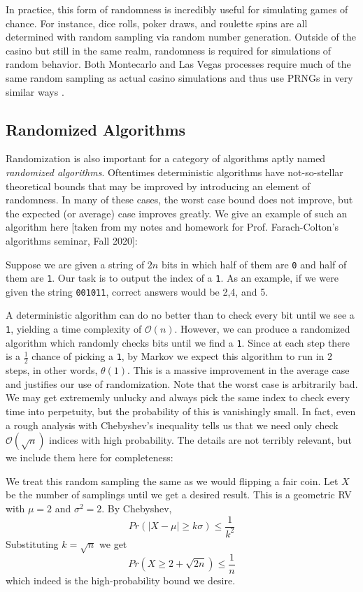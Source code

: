 \documentclass[titlepage]{article}
\theoremstyle{definition}
\newenvironment{myindentpar}[1]
  {\begin{list}{}
          {\setlength{\leftmargin}{#1}
          \setlength{\rightmargin}{#1}}
          \item[]
  }
  {\end{list}}
\begin{document}
In practice, this form of randomness is incredibly useful for simulating games of chance. For instance, dice rolls, poker draws, and roulette spins are all determined with random sampling via random number generation. Outside of the casino but still in the same realm, randomness is required for simulations of random behavior. Both Montecarlo and Las Vegas processes require much of the same random sampling as actual casino simulations and thus use PRNGs in very similar ways \cite{MTWiki}.

\subsection{Randomized Algorithms}
Randomization is also important for a category of algorithms aptly named \textit{randomized algorithms}. Oftentimes deterministic algorithms have not-so-stellar theoretical bounds that may be improved by introducing an element of randomness. In many of these cases, the worst case bound does not improve, but the expected (or average) case improves greatly. We give an example of such an algorithm here [taken from my notes and homework for Prof. Farach-Colton's algorithms seminar, Fall 2020]:
\begin{myindentpar}{1em}
Suppose we are given a string of $2n$ bits in which half of them are \verb|0| and half of them are \verb|1|. Our task is to output the index of a \verb|1|. As an example, if we were given the string \verb|001011|, correct answers would be 2,4, and 5.
\end{myindentpar}
A deterministic algorithm can do no better than to check every bit until we see a \verb|1|, yielding a time complexity of $\mathcal{O}(n)$. However, we can produce a randomized algorithm which randomly checks bits until we find a \verb|1|. Since at each step there is a $\frac{1}{2}$ chance of picking a \verb|1|, by Markov we expect this algorithm to run in $2$ steps, in other words, $\theta(1)$. This is a massive improvement in the average case and justifies our use of randomization. Note that the worst case is arbitrarily bad. We may get extrememly unlucky and always pick the same index to check every time into perpetuity, but the probability of this is vanishingly small. In fact, even a rough analysis with Chebyshev's inequality tells us that we need only check $\mathcal{O}(\sqrt{n})$ indices with high probability. The details are not terribly relevant, but we include them here for completeness:
\begin{myindentpar}{1em}
We treat this random sampling the same as we would flipping a fair coin. Let $X$ be the number of samplings until we get a desired result. This is a geometric RV with $\mu = 2$ and $\sigma^2 = 2$. By Chebyshev,
$$Pr(|X - \mu| \geqslant k\sigma ) \leqslant \frac{1}{k^2}$$
Substituting $k = \sqrt{n}$ we get
$$Pr(X \geqslant 2 + \sqrt{2n}) \leqslant \frac{1}{n}$$
which indeed is the high-probability bound we desire.
\end{myindentpar}
\end{document}

